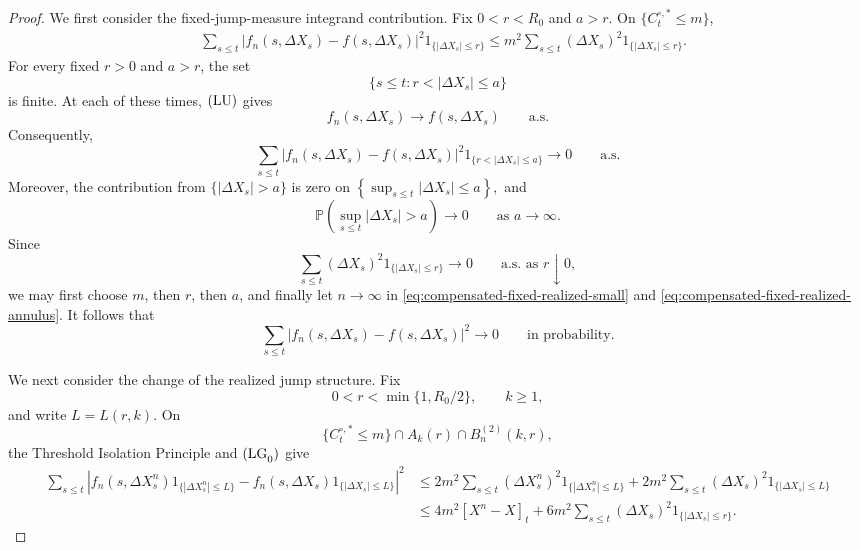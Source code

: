 \documentclass[a4paper,10pt]{article}
\begin{document}
\begin{proof}
We first consider the fixed-jump-measure integrand contribution. Fix
\(0<r<R_0\) and \(a>r\). On \(\{C_t^{\circ,*}\le m\}\),
\begin{equation}
\begin{aligned}
&\sum_{s\le t}
\left|
f_n(s,\Delta X_s)-f(s,\Delta X_s)
\right|^2
1_{\{|\Delta X_s|\le r\}}
\le
m^2
\sum_{s\le t}
(\Delta X_s)^2
1_{\{|\Delta X_s|\le r\}}.
\end{aligned}
\label{eq:compensated-fixed-realized-small}
\end{equation}
For every fixed \(r>0\) and \(a>r\), the set
\[
        \{s\le t:r<|\Delta X_s|\le a\}
\]
is finite. At each of these times, \({\rm (LU)}\) gives
\[
        f_n(s,\Delta X_s)\longrightarrow f(s,\Delta X_s)
        \qquad\text{a.s.}
\]
Consequently,
\begin{equation}
\sum_{s\le t}
\left|
f_n(s,\Delta X_s)-f(s,\Delta X_s)
\right|^2
1_{\{r<|\Delta X_s|\le a\}}
\longrightarrow0
\qquad\text{a.s.}
\label{eq:compensated-fixed-realized-annulus}
\end{equation}
Moreover, the contribution from \(\{|\Delta X_s|>a\}\) is zero on
$
        \left\{\sup_{s\le t}|\Delta X_s|\le a\right\},
$
and
\[
        \mathbb P\left(\sup_{s\le t}|\Delta X_s|>a\right)
        \longrightarrow0
        \qquad\text{as }a\to\infty.
\]
Since
\[
\sum_{s\le t}
(\Delta X_s)^2
1_{\{|\Delta X_s|\le r\}}
\longrightarrow0
\qquad\text{a.s. as }r\downarrow0,
\]
we may first choose \(m\), then \(r\), then \(a\), and finally let
\(n\to\infty\) in \eqref{eq:compensated-fixed-realized-small} and
\eqref{eq:compensated-fixed-realized-annulus}. It follows that
\begin{equation}
\sum_{s\le t}
\left|
f_n(s,\Delta X_s)-f(s,\Delta X_s)
\right|^2
\longrightarrow0
\qquad\text{in probability}.
\label{eq:compensated-fixed-realized-convergence}
\end{equation}

We next consider the change of the realized jump structure. Fix
\[
        0<r<\min\{1,R_0/2\},
        \qquad k\ge1,
\]
and write \(L=L(r,k)\). On
\[
        \{C_t^{\circ,*}\le m\}
        \cap A_k(r)\cap B_n^{(2)}(k,r),
\]
the Threshold Isolation Principle and \({\rm (LG}_0{\rm )}\) give
\begin{align}
\sum_{s\le t}
\left|
f_n(s,\Delta X^n_s)1_{\{|\Delta X^n_s|\le L\}}
-
f_n(s,\Delta X_s)1_{\{|\Delta X_s|\le L\}}
\right|^2
&\le
2m^2
\sum_{s\le t}
(\Delta X^n_s)^2
1_{\{|\Delta X^n_s|\le L\}}
+
2m^2
\sum_{s\le t}
(\Delta X_s)^2
1_{\{|\Delta X_s|\le L\}}
\nonumber\\
&\le
4m^2[X^n-X]_t
+
6m^2
\sum_{s\le t}
(\Delta X_s)^2
1_{\{|\Delta X_s|\le r\}}.
\label{eq:compensated-realized-small-structure}
\end{align}


\end{proof}
\end{document}
